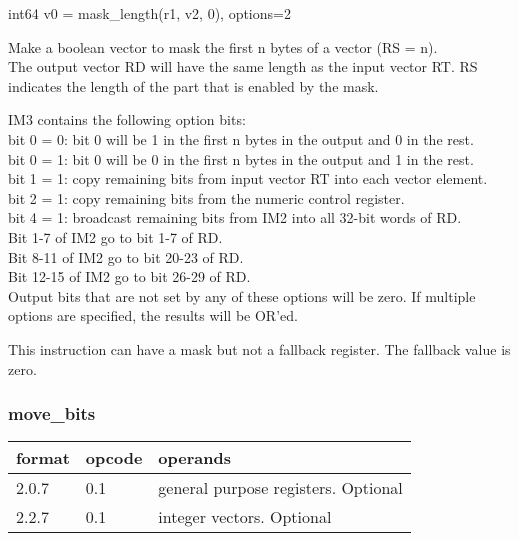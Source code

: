 \documentclass[forwardcom.tex]{subfiles}
\begin{document}
int64 v0 = mask\_length(r1, v2, 0), options=2
\vspace{2mm}

Make a boolean vector to mask the first n bytes of a vector (RS = n). \\
The output vector RD will have the same length as the input vector RT. RS indicates the length of the part that is enabled by the mask. 
\vspace{2mm}

IM3 contains the following option bits: \\
bit 0 = 0: bit 0 will be 1 in the first n bytes in the output and 0 in the rest. \\
bit 0 = 1: bit 0 will be 0 in the first n bytes in the output and 1 in the rest. \\
bit 1 = 1: copy remaining bits from input vector RT into each vector element. \\
bit 2 = 1: copy remaining bits from the numeric control register. \\
bit 4 = 1: broadcast remaining bits from IM2 into all 32-bit words of RD. \\
\hspace{17mm} Bit 1-7 of IM2 go to bit 1-7 of RD. \\
\hspace{17mm} Bit 8-11 of IM2 go to bit 20-23 of RD. \\
\hspace{17mm} Bit 12-15 of IM2 go to bit 26-29 of RD. \\
Output bits that are not set by any of these options will be zero. 
If multiple options are specified, the results will be OR'ed.

\vspace{2mm}
This instruction can have a mask but not a fallback register. The fallback value is zero.


\subsubsection{move\_bits}
\label{table:moveBitsInstruction}
\begin{tabular}{|p{12mm}|p{12mm}|p{110mm}|}
\hline
\bfseries format & \bfseries opcode & \bfseries operands \\ \hline
2.0.7 & 0.1 & general purpose registers. Optional \\ \hline
2.2.7 & 0.1 & integer vectors. Optional \\ \hline
\end{tabular}
\vspace{2mm}
\end{document}
